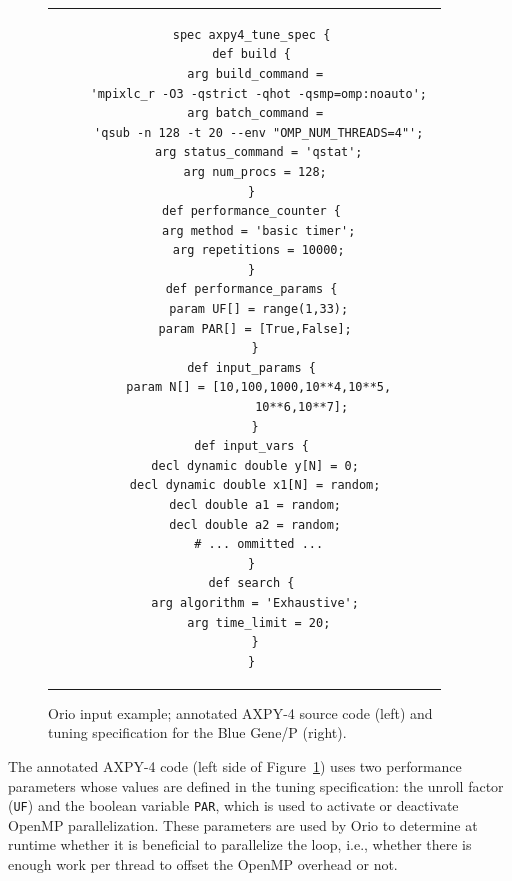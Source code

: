 \begin{figure}[thb]
\begin{tabular}{cc}
\begin{minipage}{.5\textwidth}
\begin{verbatim}
\end{verbatim}  
\end{minipage}
&
\begin{minipage}{.5\textwidth}  
\scriptsize
\begin{verbatim}  
spec axpy4_tune_spec {
 def build { 
  arg build_command = 
   'mpixlc_r -O3 -qstrict -qhot -qsmp=omp:noauto'; 
  arg batch_command = 
   'qsub -n 128 -t 20 --env "OMP_NUM_THREADS=4"'; 
  arg status_command = 'qstat';
  arg num_procs = 128; 
 } 
 def performance_counter { 
  arg method = 'basic timer';
  arg repetitions = 10000;
 } 
 def performance_params { 
  param UF[] = range(1,33);
  param PAR[] = [True,False]; 
 }
 def input_params { 
  param N[] = [10,100,1000,10**4,10**5,
               10**6,10**7]; 
 }
 def input_vars { 
  decl dynamic double y[N] = 0; 
  decl dynamic double x1[N] = random; 
  decl double a1 = random; 
  decl double a2 = random; 
  # ... ommitted ...
 } 
 def search { 
  arg algorithm = 'Exhaustive'; 
  arg time_limit = 20;
 }
}
\end{verbatim}  
\end{minipage}
\\
\end{tabular}
\caption{Orio input example; annotated AXPY-4 source code (left) and tuning specification for the Blue Gene/P (right).}
\label{fig:orio-example}  
\end{figure} 

The annotated AXPY-4 code (left side of Figure~\ref{fig:orio-example}) uses two
performance parameters whose values are defined in the tuning specification:
the unroll factor (\texttt{UF})
and the boolean variable \texttt{PAR}, which is used to activate or
deactivate OpenMP parallelization. 
These parameters are used by Orio to determine at runtime whether it is
beneficial to parallelize the loop, i.e., whether there is enough work per
thread to offset the OpenMP overhead or not.

